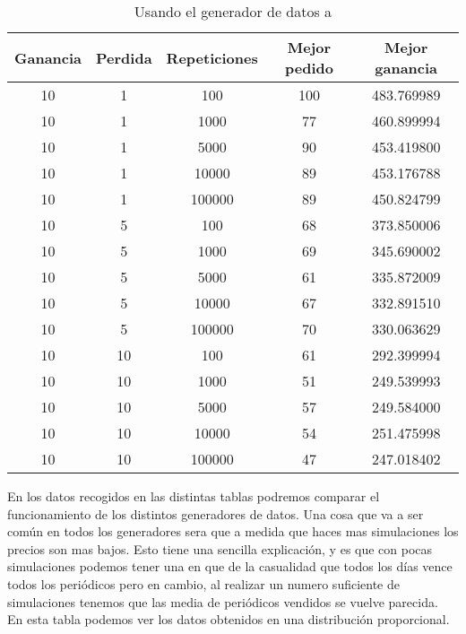 \documentclass[12pt,a4paper]{article}
\begin{document}
\begin{table}[H]
\begin{tabular}{ccccc} \toprule
	{Ganancia} & {Perdida} & {Repeticiones} & {Mejor pedido} & {Mejor ganancia} \\ \midrule
	10  & 1 & 100 & 100 & 483.769989 \\
	10  & 1 & 1000 & 77 & 460.899994 \\
	10  & 1 & 5000 & 90 & 453.419800 \\
	10  & 1 & 10000 & 89 & 453.176788 \\
	10  & 1 & 100000 & 89 & 450.824799 \\ \midrule
	
	10  & 5 & 100 & 68 & 373.850006 \\
	10  & 5 & 1000 & 69 & 345.690002 \\
	10  & 5 & 5000 & 61 & 335.872009 \\
	10  & 5 & 10000 & 67 & 332.891510 \\
	10  & 5 & 100000 & 70 & 330.063629 \\ \midrule
	
	10  & 10 & 100 & 61 & 292.399994 \\
	10  & 10 & 1000 & 51 & 249.539993 \\
	10  & 10 & 5000 & 57 & 249.584000 \\
	10  & 10 & 10000 & 54 & 251.475998 \\
	10  & 10 & 100000 & 47 & 247.018402\\ \midrule	
\end{tabular}
\caption{Usando el generador de datos a} \label{tab:genDataA}
\end{table}
En los datos recogidos en las distintas tablas podremos comparar el funcionamiento de los distintos generadores de datos. Una cosa que va a ser común en todos los generadores sera que a medida que haces mas simulaciones los precios son mas bajos. Esto tiene una sencilla explicación, y es que con pocas simulaciones podemos tener una en que de la casualidad que todos los días vence todos los periódicos pero en cambio, al realizar un numero suficiente de simulaciones tenemos que las media de periódicos vendidos se vuelve parecida. \\ En esta tabla podemos ver los datos obtenidos en una distribución proporcional. 
\end{document}
